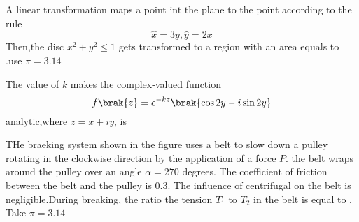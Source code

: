\begin{figure}[!ht]
\centering
{}%

\label{fig:my_label}
\end{figure}
\item A linear transformation maps a point  int the plane to the point  according to the rule
\begin{equation}
    \hat{x}=3y,   \hat{y}=2x
\end{equation}
Then,the disc $x^2+y^2\leq 1$ gets transformed to a region with an area equals to \underline{\hspace{2cm}}.use $\pi=3.14$
\item The value of $k$ makes the complex-valued function 
\begin{equation}
    f\brak{z}=e^{-kz}\brak{\cos 2y-i\sin 2y}
\end{equation}
analytic,where $z=x+iy$, is \underline{\hspace{2cm}}
\item THe braeking system shown in the figure uses a belt to slow down a pulley rotating in the clockwise direction by the application of a force $P$. the belt wraps around the pulley over an angle $\alpha= 270$ degrees. The coefficient of friction between the belt and the pulley is $0.3$. The influence of centrifugal on the belt is negligible.During breaking, the ratio the tension $T_1$ to $T_2$ in the belt is equal to \underline{\hspace{2cm}}. Take $\pi=3.14$
